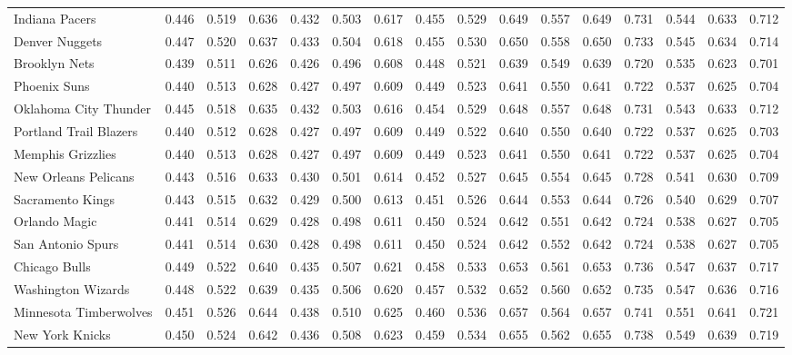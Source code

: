 \documentclass[11pt,a4paper]{article}
\begin{document}
\begin{table}[H]
\begin{tabular}{l ccc ccc ccc ccc ccc}
Indiana Pacers & 0.446 & 0.519 & 0.636 & 0.432 & 0.503 & 0.617 & 0.455 & 0.529 & 0.649 & 0.557 & 0.649 & 0.731 & 0.544 & 0.633 & 0.712 \\
Denver Nuggets & 0.447 & 0.520 & 0.637 & 0.433 & 0.504 & 0.618 & 0.455 & 0.530 & 0.650 & 0.558 & 0.650 & 0.733 & 0.545 & 0.634 & 0.714 \\
Brooklyn Nets & 0.439 & 0.511 & 0.626 & 0.426 & 0.496 & 0.608 & 0.448 & 0.521 & 0.639 & 0.549 & 0.639 & 0.720 & 0.535 & 0.623 & 0.701 \\
Phoenix Suns & 0.440 & 0.513 & 0.628 & 0.427 & 0.497 & 0.609 & 0.449 & 0.523 & 0.641 & 0.550 & 0.641 & 0.722 & 0.537 & 0.625 & 0.704 \\
Oklahoma City Thunder & 0.445 & 0.518 & 0.635 & 0.432 & 0.503 & 0.616 & 0.454 & 0.529 & 0.648 & 0.557 & 0.648 & 0.731 & 0.543 & 0.633 & 0.712 \\
Portland Trail Blazers & 0.440 & 0.512 & 0.628 & 0.427 & 0.497 & 0.609 & 0.449 & 0.522 & 0.640 & 0.550 & 0.640 & 0.722 & 0.537 & 0.625 & 0.703 \\
Memphis Grizzlies & 0.440 & 0.513 & 0.628 & 0.427 & 0.497 & 0.609 & 0.449 & 0.523 & 0.641 & 0.550 & 0.641 & 0.722 & 0.537 & 0.625 & 0.704 \\
New Orleans Pelicans & 0.443 & 0.516 & 0.633 & 0.430 & 0.501 & 0.614 & 0.452 & 0.527 & 0.645 & 0.554 & 0.645 & 0.728 & 0.541 & 0.630 & 0.709 \\
Sacramento Kings & 0.443 & 0.515 & 0.632 & 0.429 & 0.500 & 0.613 & 0.451 & 0.526 & 0.644 & 0.553 & 0.644 & 0.726 & 0.540 & 0.629 & 0.707 \\
Orlando Magic & 0.441 & 0.514 & 0.629 & 0.428 & 0.498 & 0.611 & 0.450 & 0.524 & 0.642 & 0.551 & 0.642 & 0.724 & 0.538 & 0.627 & 0.705 \\
San Antonio Spurs & 0.441 & 0.514 & 0.630 & 0.428 & 0.498 & 0.611 & 0.450 & 0.524 & 0.642 & 0.552 & 0.642 & 0.724 & 0.538 & 0.627 & 0.705 \\
Chicago Bulls & 0.449 & 0.522 & 0.640 & 0.435 & 0.507 & 0.621 & 0.458 & 0.533 & 0.653 & 0.561 & 0.653 & 0.736 & 0.547 & 0.637 & 0.717 \\
Washington Wizards & 0.448 & 0.522 & 0.639 & 0.435 & 0.506 & 0.620 & 0.457 & 0.532 & 0.652 & 0.560 & 0.652 & 0.735 & 0.547 & 0.636 & 0.716 \\
Minnesota Timberwolves & 0.451 & 0.526 & 0.644 & 0.438 & 0.510 & 0.625 & 0.460 & 0.536 & 0.657 & 0.564 & 0.657 & 0.741 & 0.551 & 0.641 & 0.721 \\
New York Knicks & 0.450 & 0.524 & 0.642 & 0.436 & 0.508 & 0.623 & 0.459 & 0.534 & 0.655 & 0.562 & 0.655 & 0.738 & 0.549 & 0.639 & 0.719 \\

\end{tabular}
\end{table}
\end{document}
